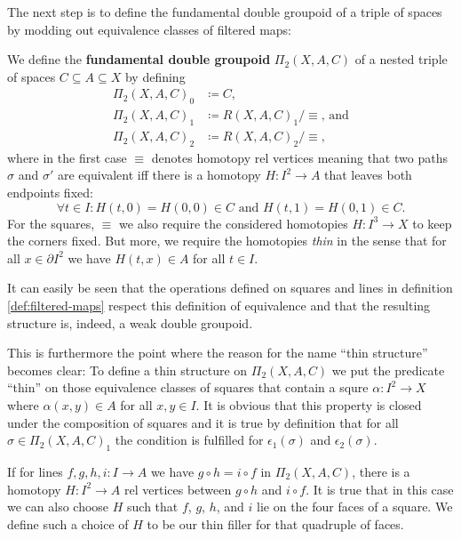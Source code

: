 The next step is to define the fundamental double groupoid of a triple of
spaces by modding out equivalence classes of filtered maps:

\begin{defn}
We define the \textbf{fundamental double groupoid} $\Pi_2(X, A, C)$ of a nested
triple of spaces $C \subseteq A \subseteq X$ by defining
\begin{align*}
\Pi_2(X, A, C)_0 &\coloneqq C \text{,}\\
\Pi_2(X, A, C)_1 &\coloneqq R(X,A,C)_1 / \equiv \text{, and} \\
\Pi_2(X, A, C)_2 &\coloneqq R(X,A,C)_2 / \equiv \text{,}
\end{align*}
where in the first case $\equiv$ denotes homotopy rel vertices meaning that two
paths $\sigma$ and $\sigma'$ are equivalent iff there is a homotopy
$H : I^2 \to A$ that leaves both endpoints fixed:
\begin{equation*}
\forall t \in I : H(t,0) = H(0,0) \in C \text{ and } H(t,1) = H(0,1) \in C \text{.}
\end{equation*}
For the squares, $\equiv$ we also require the considered homotopies 
$H : I^3 \to X$ to keep the corners fixed.
But more, we require the homotopies \emph{thin} in the sense that for all
$x \in \partial I^2$ we have $H(t,x) \in A$ for all $t \in I$.

It can easily be seen that the operations defined on squares and lines in
definition \ref{def:filtered-maps} respect this definition of equivalence and that
the resulting structure is, indeed, a weak double groupoid.

This is furthermore the point where the reason for the name ``thin structure'' becomes
clear:
To define a thin structure on $\Pi_2(X, A, C)$ we put the predicate ``thin''
on those equivalence classes of squares that contain a squre $\alpha : I^2 \to X$
where $\alpha(x, y) \in A$ for all $x, y \in I$.
It is obvious that this property is closed under the composition of squares and
it is true by definition that for all $\sigma \in \Pi_2(X, A, C)_1$ the condition
is fulfilled for $\epsilon_1(\sigma)$ and $\epsilon_2(\sigma)$.

If for lines $f, g, h, i : I \to A$ we have $g \circ h = i \circ f$ in
$\Pi_2(X, A, C)$, there is a homotopy $H : I^2 \to A$ rel vertices between
$g \circ h$ and $i \circ f$.
It is true that in this case we can also choose $H$ such that $f$, $g$, $h$, and
$i$ lie on the four faces of a square.
We define such a choice of $H$ to be our thin filler for that quadruple of faces.


\end{defn}
